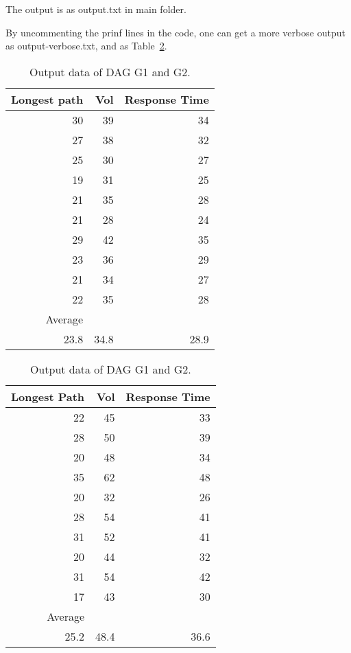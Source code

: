\documentclass[./report.tex]{subfiles}
\begin{document}
The output is as output.txt in main folder.

By uncommenting the prinf lines in the code, one can get a more verbose output as output-verbose.txt, and as Table~\ref{tab:dag-g1}.

\begin{table}[htbp]
  \centering
  \caption{Output data of DAG G1 and G2.}
  \label{tab:dag-g1}
  \begin{minipage}[b]{0.45\linewidth}
    \begin{tabular}{rrr}
      \hline
      Longest path&Vol&Response Time\\
      \hline
      30&	39&	34\\
      \hline
      27&	38&	32\\
      \hline
      25&	30&	27\\
      \hline
      19&	31&	25\\
      \hline
      21&	35&	28\\
      \hline
      21&	28&	24\\
      \hline
      29&	42&	35\\
      \hline
      23&	36&	29\\
      \hline
      21&	34&	27\\
      \hline
      22&	35&	28\\
      \hline
      Average&&\\
      \hline
      23.8	&34.8	&28.9\\
      \hline
    \end{tabular}
  \end{minipage}
  \begin{minipage}[b]{0.45\linewidth}
      \begin{tabular}{rrr}
        \hline
        Longest Path&Vol&Response Time\\
        \hline
        22	&45	&33\\
        \hline
        28	&50	&39\\
        \hline
        20	&48	&34\\
        \hline
        35	&62	&48\\
        \hline
        20	&32	&26\\
        \hline
        28	&54	&41\\
        \hline
        31	&52	&41\\
        \hline
        20	&44	&32\\
        \hline
        31	&54	&42\\
        \hline
        17	&43	&30\\
        \hline	
        Average&&\\
        \hline
        25.2	&48.4	&36.6\\
        \hline
      \end{tabular}
  \end{minipage}
\end{table}
\end{document}
